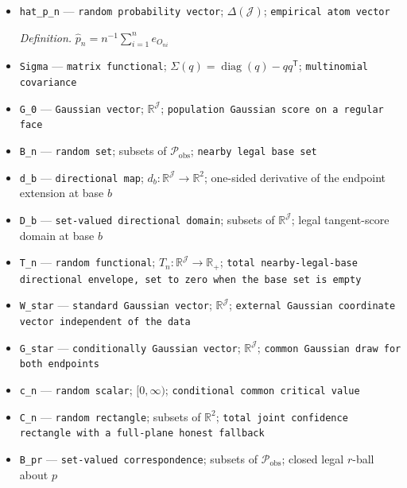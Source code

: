 \documentclass{article}
\begin{document}
\begin{itemize}
  \par\smallskip\noindent\emph{Definition.} \(p_n^{(4)}=p_{Q_n^{(4)}}\)
  \item \texttt{hat\_\allowbreak{}p\_\allowbreak{}n} --- \texttt{random probability vector}; \(\Delta(\mathcal J)\); \texttt{empirical atom vector}
  \par\smallskip\noindent\emph{Definition.} \(\widehat p_n=n^{-1}\sum_{i=1}^n e_{O_{ni}}\)
  \item \texttt{Sigma} --- \texttt{matrix functional}; \(\Sigma(q)=\operatorname{diag}(q)-qq^{\mathsf T}\); \texttt{multinomial covariance}
  \item \texttt{G\_\allowbreak{}0} --- \texttt{Gaussian vector}; \(\mathbb R^{\mathcal J}\); \texttt{population Gaussian score on a regular face}
  \item \texttt{B\_\allowbreak{}n} --- \texttt{random set}; subsets of \(\mathcal P_{\mathrm{obs}}\); \texttt{nearby legal base set}
  \item \texttt{d\_\allowbreak{}b} --- \texttt{directional map}; \(d_b:\mathbb R^{\mathcal J}\to\mathbb R^2\); one-sided derivative of the endpoint extension at base \(b\)
  \item \texttt{D\_\allowbreak{}b} --- \texttt{set-\allowbreak{}valued directional domain}; subsets of \(\mathbb R^{\mathcal J}\); legal tangent-score domain at base \(b\)
  \item \texttt{T\_\allowbreak{}n} --- \texttt{random functional}; \(T_n:\mathbb R^{\mathcal J}\to\mathbb R_+\); \texttt{total nearby-\allowbreak{}legal-\allowbreak{}base directional envelope,\allowbreak{} set to zero when the base set is empty}
  \item \texttt{W\_\allowbreak{}star} --- \texttt{standard Gaussian vector}; \(\mathbb R^{\mathcal J}\); \texttt{external Gaussian coordinate vector independent of the data}
  \item \texttt{G\_\allowbreak{}star} --- \texttt{conditionally Gaussian vector}; \(\mathbb R^{\mathcal J}\); \texttt{common Gaussian draw for both endpoints}
  \item \texttt{c\_\allowbreak{}n} --- \texttt{random scalar}; \([0,\infty)\); \texttt{conditional common critical value}
  \item \texttt{C\_\allowbreak{}n} --- \texttt{random rectangle}; subsets of \(\mathbb R^2\); \texttt{total joint confidence rectangle with a full-\allowbreak{}plane honest fallback}
  \item \texttt{B\_\allowbreak{}pr} --- \texttt{set-\allowbreak{}valued correspondence}; subsets of \(\mathcal P_{\mathrm{obs}}\); closed legal \(r\)-ball about \(p\)

\end{itemize}
\end{document}
